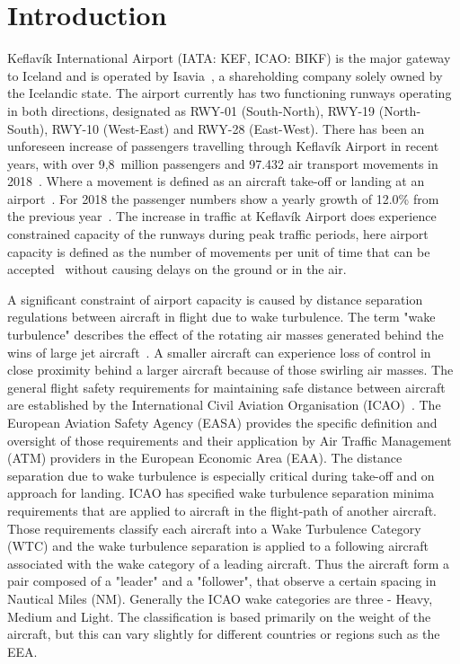 \chapter{Introduction\label{cha:introduction}}

Keflavík International Airport (IATA: KEF, ICAO: BIKF) is the major gateway to Iceland and is operated by Isavia~\cite{Isavia_about}, a shareholding company solely owned by the Icelandic state. The airport currently has two functioning runways operating in both directions, designated as RWY-01 (South-North), RWY-19 (North-South), RWY-10 (West-East) and RWY-28 (East-West). 
There has been an unforeseen increase of passengers travelling through Keflavík Airport in recent years, with over 9,8~million passengers and 97.432 air transport movements in 2018~\cite{isavia_facts_2017}. Where a movement is defined as an aircraft take-off or landing at an airport~\cite{aircraft_movement}. For 2018 the passenger numbers show a yearly growth of 12.0\% from the previous year~\cite{isavia_pass_statistics_2018}. The increase in traffic at Keflavík Airport does experience constrained capacity of the runways during peak traffic periods, here airport capacity is defined as the number of movements per unit of time that can be accepted~\cite{airport_capacity_methodology} without causing delays on the ground or in the air.  

A significant constraint of airport capacity is caused by distance separation regulations between aircraft in flight due to wake turbulence. The term "wake turbulence" describes the effect of the rotating air masses generated behind the wins of large jet aircraft~\cite{doc4444full}. A smaller aircraft can experience loss of control in close proximity behind a larger aircraft because of those swirling air masses. The general flight safety requirements for maintaining safe distance between aircraft are established by the International Civil Aviation Organisation (ICAO)~\cite{doc4444full}. The European Aviation Safety Agency (EASA) provides the specific definition and oversight of those requirements and their application by Air Traffic Management (ATM) providers in the European Economic Area (EAA). 
The distance separation due to wake turbulence is especially critical during take-off and on approach for landing. ICAO has specified wake turbulence separation minima requirements that are applied to aircraft in the flight-path of another aircraft. Those requirements classify each aircraft into a Wake Turbulence Category (WTC) and the wake turbulence separation is applied to a following aircraft associated with the wake category of a leading aircraft. Thus the aircraft form a pair composed of a "leader" and a "follower", that observe a certain spacing in Nautical Miles (NM). Generally the ICAO wake categories are three - Heavy, Medium and Light. The classification is based primarily on the weight of the aircraft, but this can vary slightly for different countries or regions such as the EEA.

